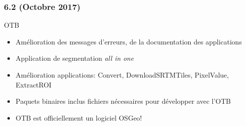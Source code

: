 \begin{frame}
  \frametitle{6.2 (Octobre 2017)}
  \begin{block}{OTB}
    \begin{itemize}
      \item Amélioration des messages d'erreurs, de la documentation des applications
      \item Application de segmentation \textit{all in one}
      \item Amélioration applications: Convert, DownloadSRTMTiles, PixelValue, ExtractROI
      \item Paquets binaires inclus fichiers nécessaires pour développer avec l'OTB
      \item OTB est officiellement un logiciel OSGeo!
    \end{itemize}
    \end{block}
\end{frame}
